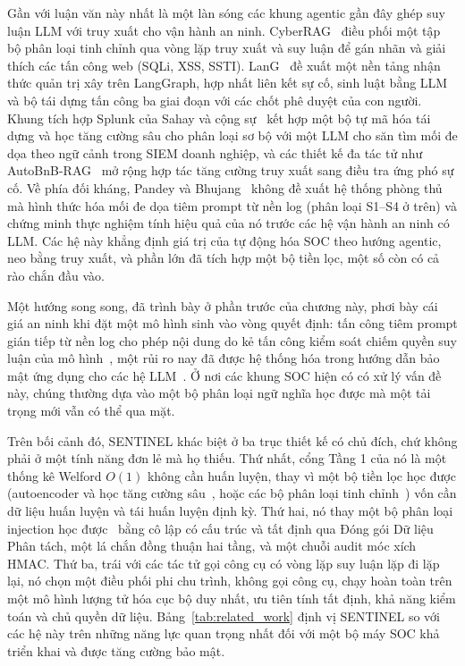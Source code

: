 Gần với luận văn này nhất là một làn sóng các khung agentic gần đây ghép suy luận LLM với truy xuất cho vận hành an ninh. CyberRAG~\cite{cyberrag2025} điều phối một tập bộ phân loại tinh chỉnh qua vòng lặp truy xuất và suy luận để gán nhãn và giải thích các tấn công web (SQLi, XSS, SSTI). LanG~\cite{lang2026} đề xuất một nền tảng nhận thức quản trị xây trên LangGraph, hợp nhất liên kết sự cố, sinh luật bằng LLM và bộ tái dựng tấn công ba giai đoạn với các chốt phê duyệt của con người. Khung tích hợp Splunk của Sahay và cộng sự~\cite{splunkllm2026} kết hợp một bộ tự mã hóa tái dựng và học tăng cường sâu cho phân loại sơ bộ với một LLM cho săn tìm mối đe dọa theo ngữ cảnh trong SIEM doanh nghiệp, và các thiết kế đa tác tử như AutoBnB-RAG~\cite{autobnb2025} mở rộng hợp tác tăng cường truy xuất sang điều tra ứng phó sự cố. Về phía đối kháng, Pandey và Bhujang~\cite{watchtower2026} không đề xuất hệ thống phòng thủ mà hình thức hóa mối đe dọa tiêm prompt từ nền log (phân loại S1--S4 ở trên) và chứng minh thực nghiệm tính hiệu quả của nó trước các hệ vận hành an ninh có LLM. Các hệ này khẳng định giá trị của tự động hóa SOC theo hướng agentic, neo bằng truy xuất, và phần lớn đã tích hợp một bộ tiền lọc, một số còn có cả rào chắn đầu vào.

Một hướng song song, đã trình bày ở phần trước của chương này, phơi bày cái giá an ninh khi đặt một mô hình sinh vào vòng quyết định: tấn công tiêm prompt gián tiếp từ nền log cho phép nội dung do kẻ tấn công kiểm soát chiếm quyền suy luận của mô hình~\cite{promptinjection2023, watchtower2026}, một rủi ro nay đã được hệ thống hóa trong hướng dẫn bảo mật ứng dụng cho các hệ LLM~\cite{owasp_llm2025}. Ở nơi các khung SOC hiện có có xử lý vấn đề này, chúng thường dựa vào một bộ phân loại ngữ nghĩa học được mà một tải trọng mới vẫn có thể qua mặt.

Trên bối cảnh đó, SENTINEL khác biệt ở ba trục thiết kế có chủ đích, chứ không phải ở một tính năng đơn lẻ mà họ thiếu. Thứ nhất, cổng Tầng 1 của nó là một thống kê Welford $O(1)$ không cần huấn luyện, thay vì một bộ tiền lọc học được (autoencoder và học tăng cường sâu~\cite{splunkllm2026}, hoặc các bộ phân loại tinh chỉnh~\cite{cyberrag2025}) vốn cần dữ liệu huấn luyện và tái huấn luyện định kỳ. Thứ hai, nó thay một bộ phân loại injection học được~\cite{lang2026} bằng cô lập có cấu trúc và tất định qua Đóng gói Dữ liệu Phân tách, một lá chắn đồng thuận hai tầng, và một chuỗi audit móc xích HMAC. Thứ ba, trái với các tác tử gọi công cụ có vòng lặp suy luận lặp đi lặp lại, nó chọn một điều phối phi chu trình, không gọi công cụ, chạy hoàn toàn trên một mô hình lượng tử hóa cục bộ duy nhất, ưu tiên tính tất định, khả năng kiểm toán và chủ quyền dữ liệu. Bảng~\ref{tab:related_work} định vị SENTINEL so với các hệ này trên những năng lực quan trọng nhất đối với một bộ máy SOC khả triển khai và được tăng cường bảo mật.

